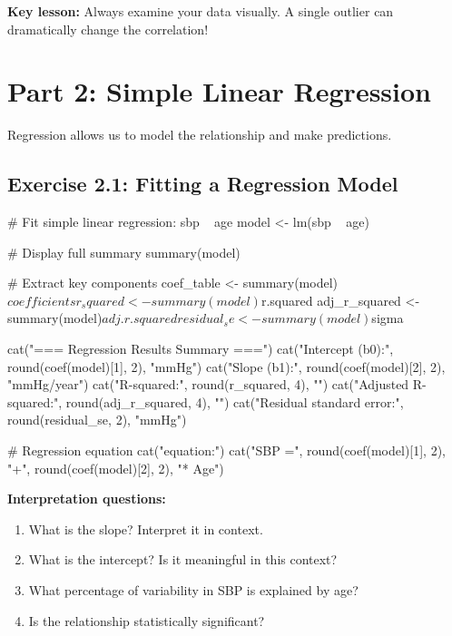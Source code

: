 \documentclass[11pt]{article}
\begin{document}
\textbf{Key lesson:} Always examine your data visually. A single outlier can dramatically change the correlation!

\vspace{0.5cm}

\section{Part 2: Simple Linear Regression}

Regression allows us to model the relationship and make predictions.

\subsection{Exercise 2.1: Fitting a Regression Model}

\begin{rcode}
# Fit simple linear regression: sbp ~ age
model <- lm(sbp ~ age)

# Display full summary
summary(model)

# Extract key components
coef_table <- summary(model)$coefficients
r_squared <- summary(model)$r.squared
adj_r_squared <- summary(model)$adj.r.squared
residual_se <- summary(model)$sigma

cat("\n=== Regression Results Summary ===\n")
cat("Intercept (b0):", round(coef(model)[1], 2), "mmHg\n")
cat("Slope (b1):", round(coef(model)[2], 2), "mmHg/year\n")
cat("R-squared:", round(r_squared, 4), "\n")
cat("Adjusted R-squared:", round(adj_r_squared, 4), "\n")
cat("Residual standard error:", round(residual_se, 2), "mmHg\n")

# Regression equation
cat("\nRegression equation:\n")
cat("SBP =", round(coef(model)[1], 2), "+",
    round(coef(model)[2], 2), "* Age\n")
\end{rcode}

\textbf{Interpretation questions:}
\begin{enumerate}[label=\alph*)]
\item What is the slope? Interpret it in context.
\item What is the intercept? Is it meaningful in this context?
\item What percentage of variability in SBP is explained by age?
\item Is the relationship statistically significant?
\end{enumerate}

\vspace{2cm}
\end{document}
